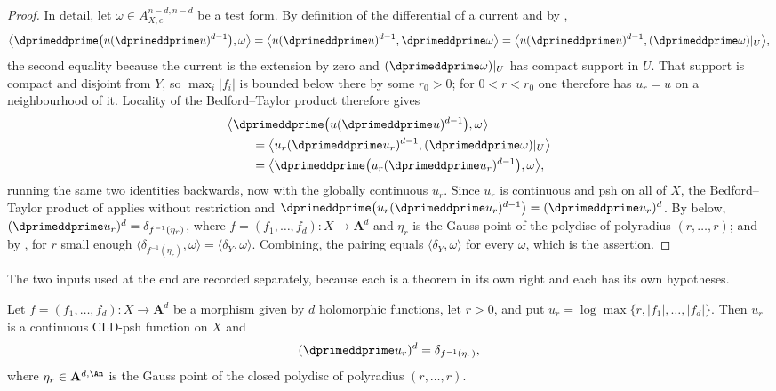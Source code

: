 \begin{proof}
In detail, let $\omega\in A_{X,c}^{n-d,n-d}$ be a test form.  By definition
of the differential of a current and by
,
\[
 \bigl\langle\dprimeddprime\bigl(u(\dprimeddprime u)^{d-1}\bigr),
   \omega\bigr\rangle
 =\bigl\langle u(\dprimeddprime u)^{d-1},\dprimeddprime\omega\bigr\rangle
 =\bigl\langle u(\dprimeddprime u)^{d-1},
      (\dprimeddprime\omega)|_U\bigr\rangle ,
\]
the second equality because the current is the extension by zero and
$(\dprimeddprime\omega)|_U$ has compact support in $U$.  That support is
compact and disjoint from $Y$, so $\max_i|f_i|$ is bounded below there by
some $r_0>0$; for $0<r<r_0$ one therefore has $u_r=u$ on a neighbourhood
of it.  Locality of the Bedford--Taylor product therefore gives
\[
 \begin{aligned}
  &\bigl\langle\dprimeddprime
     \bigl(u(\dprimeddprime u)^{d-1}\bigr),\omega\bigr\rangle\\
  &\qquad=\bigl\langle u_r(\dprimeddprime u_r)^{d-1},
      (\dprimeddprime\omega)|_U\bigr\rangle\\
  &\qquad=\bigl\langle\dprimeddprime
     \bigl(u_r(\dprimeddprime u_r)^{d-1}\bigr),\omega\bigr\rangle ,
 \end{aligned}
\]
running the same two identities backwards, now with the globally continuous
$u_r$.  Since $u_r$ is continuous and psh on all of $X$, the
Bedford--Taylor product of  applies without
restriction and
$\dprimeddprime\bigl(u_r(\dprimeddprime u_r)^{d-1}\bigr)
=(\dprimeddprime u_r)^d$.  By  below,
$(\dprimeddprime u_r)^d=\delta_{f^{-1}(\eta_r)}$, where
$f=(f_1,\dots,f_d):X\to\mathbf A^d$ and $\eta_r$ is the Gauss point of the
polydisc of polyradius $(r,\dots,r)$; and by
, for $r$ small enough
$\langle\delta_{f^{-1}(\eta_r)},\omega\rangle=\langle\delta_Y,\omega\rangle$.
Combining, the pairing equals $\langle\delta_Y,\omega\rangle$ for every
$\omega$, which is the assertion.
\end{proof}

The two inputs used at the end are recorded separately, because each is a
theorem in its own right and each has its own hypotheses.

\begin{proposition}
\label{prop:ch15-bm-fibre}
Let $f=(f_1,\dots,f_d):X\to\mathbf A^d$ be a morphism given by $d$
holomorphic functions, let $r>0$, and put
$u_r=\log\max\{r,|f_1|,\dots,|f_d|\}$.  Then $u_r$ is a continuous
CLD-psh function on $X$ and
\[
 (\dprimeddprime u_r)^d=\delta_{f^{-1}(\eta_r)} ,
\]
where $\eta_r\in\mathbf A^{d,\An}$ is the Gauss point of the closed polydisc
of polyradius $(r,\dots,r)$.
\end{proposition}


